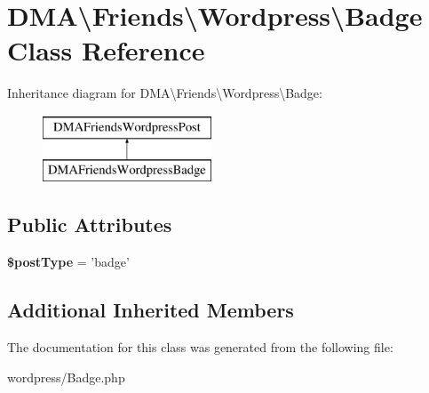 \hypertarget{classDMA_1_1Friends_1_1Wordpress_1_1Badge}{\section{D\-M\-A\textbackslash{}Friends\textbackslash{}Wordpress\textbackslash{}Badge Class Reference}
\label{classDMA_1_1Friends_1_1Wordpress_1_1Badge}
}
Inheritance diagram for D\-M\-A\textbackslash{}Friends\textbackslash{}Wordpress\textbackslash{}Badge\-:\begin{figure}[H]
\begin{center}
\leavevmode
\includegraphics[height=2.000000cm]{d8/d3a/classDMA_1_1Friends_1_1Wordpress_1_1Badge}
\end{center}
\end{figure}
\subsection*{Public Attributes}
\begin{DoxyCompactItemize}
\item 
\hypertarget{classDMA_1_1Friends_1_1Wordpress_1_1Badge_a3044aa841b86f76868023889de4ca114}{{\bfseries \$post\-Type} = 'badge'}\label{classDMA_1_1Friends_1_1Wordpress_1_1Badge_a3044aa841b86f76868023889de4ca114}

\end{DoxyCompactItemize}
\subsection*{Additional Inherited Members}


The documentation for this class was generated from the following file\-:\begin{DoxyCompactItemize}
\item 
wordpress/Badge.\-php\end{DoxyCompactItemize}
